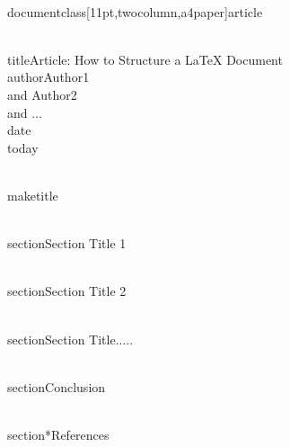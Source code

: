 \\documentclass[11pt,twocolumn,a4paper]{article}\n\n
\begin{document}
\n
\\title{Article: How to Structure a LaTeX Document}\n
\\author{Author1 \\and Author2 \\and ...}\n
\\date{\\today}\n\n

\\maketitle\n\n

\\section{Section Title 1}\n\n

\\section{Section Title 2}\n\n

\\section{Section Title.....}\n\n

\\section{Conclusion}\n\n

\\section*{References}\n\n

\
\end{document}
